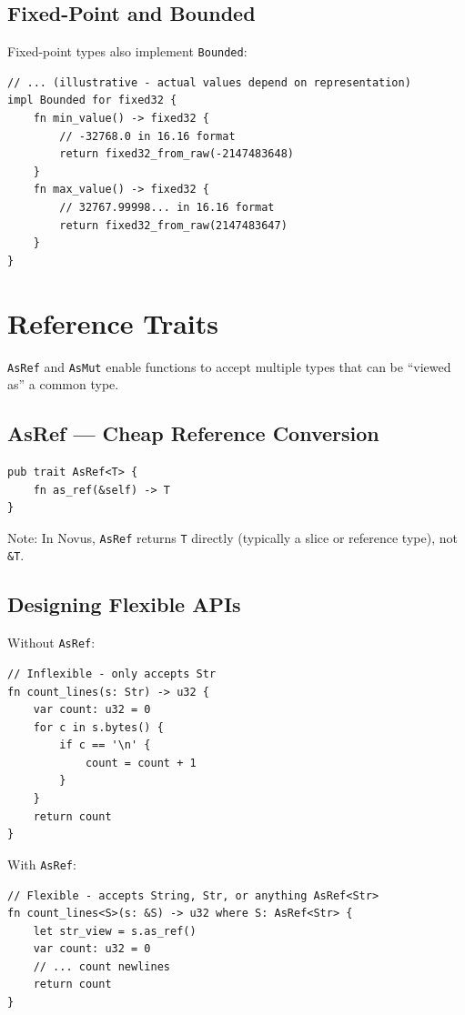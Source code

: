 \subsection{Fixed-Point and Bounded}

Fixed-point types also implement \texttt{Bounded}:

\begin{lstlisting}
// ... (illustrative - actual values depend on representation)
impl Bounded for fixed32 {
    fn min_value() -> fixed32 {
        // -32768.0 in 16.16 format
        return fixed32_from_raw(-2147483648)
    }
    fn max_value() -> fixed32 {
        // 32767.99998... in 16.16 format
        return fixed32_from_raw(2147483647)
    }
}
\end{lstlisting}


\section{Reference Traits}
\label{sec:reference-traits}

\texttt{AsRef} and \texttt{AsMut} enable functions to accept multiple types that can be ``viewed as'' a common type.

\subsection{AsRef --- Cheap Reference Conversion}

\begin{lstlisting}
pub trait AsRef<T> {
    fn as_ref(&self) -> T
}
\end{lstlisting}

Note: In Novus, \texttt{AsRef} returns \texttt{T} directly (typically a slice or reference type), not \texttt{\&T}.

\subsection{Designing Flexible APIs}

Without \texttt{AsRef}:

\begin{lstlisting}
// Inflexible - only accepts Str
fn count_lines(s: Str) -> u32 {
    var count: u32 = 0
    for c in s.bytes() {
        if c == '\n' {
            count = count + 1
        }
    }
    return count
}
\end{lstlisting}

With \texttt{AsRef}:

\begin{lstlisting}
// Flexible - accepts String, Str, or anything AsRef<Str>
fn count_lines<S>(s: &S) -> u32 where S: AsRef<Str> {
    let str_view = s.as_ref()
    var count: u32 = 0
    // ... count newlines
    return count
}
\end{lstlisting}

